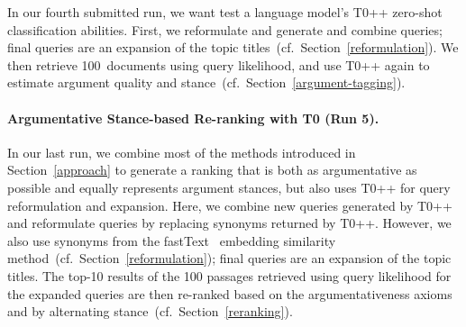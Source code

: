 In our fourth submitted run, we want test a language model's T0++ zero-shot classification abilities. First, we reformulate and generate and combine queries; final queries are an expansion of the topic titles~(cf.\ Section~\ref{reformulation}).
We then retrieve 100~documents using query likelihood, and use T0++ again to estimate argument quality and stance~(cf.\ Section~\ref{argument-tagging}).

\paragraph{Argumentative Stance-based Re-ranking with T0 (Run 5).}

In our last run, we combine most of the methods introduced in Section~\ref{approach} to generate a ranking that is both as argumentative as possible and equally represents argument stances, but also uses T0++ for query reformulation and expansion.
Here, we combine new queries generated by T0++ and reformulate queries by replacing synonyms returned by T0++. However, we also use synonyms from the fastText~\cite{BojanowskiGJM2017} embedding similarity method~(cf.\ Section~\ref{reformulation}); final queries are an expansion of the topic titles.
The top-10 results of the 100 passages retrieved using query likelihood for the expanded queries are then re-ranked based on the argumentativeness axioms and by alternating stance~(cf.\ Section~\ref{reranking}).